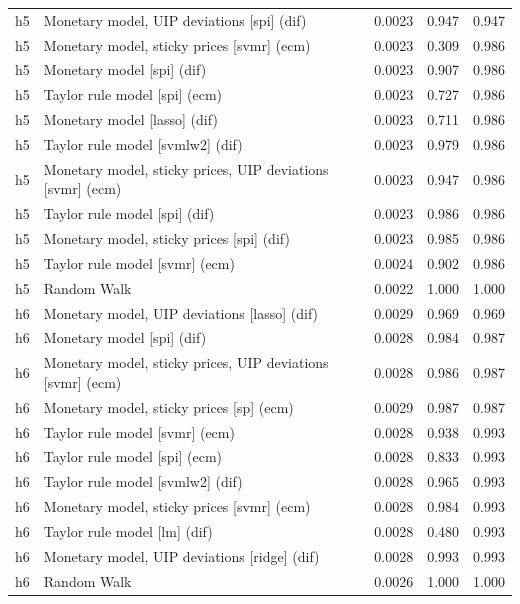 \begin{ThreePartTable}
\begin{longtable}[t]{cp{5.5cm}ccc}
\addlinespace
h5 & \raggedright Monetary model, UIP deviations [spi] (dif) & 0.0023 & 0.947 & 0.947\\
h5 & \raggedright Monetary model, sticky prices [svmr] (ecm) & 0.0023 & 0.309 & 0.986\\
h5 & \raggedright Monetary model [spi] (dif) & 0.0023 & 0.907 & 0.986\\
h5 & \raggedright Taylor rule model [spi] (ecm) & 0.0023 & 0.727 & 0.986\\
h5 & \raggedright Monetary model [lasso] (dif) & 0.0023 & 0.711 & 0.986\\
h5 & \raggedright Taylor rule model [svmlw2] (dif) & 0.0023 & 0.979 & 0.986\\
h5 & \raggedright Monetary model, sticky prices, UIP deviations [svmr] (ecm) & 0.0023 & 0.947 & 0.986\\
h5 & \raggedright Taylor rule model [spi] (dif) & 0.0023 & 0.986 & 0.986\\
h5 & \raggedright Monetary model, sticky prices [spi] (dif) & 0.0023 & 0.985 & 0.986\\
h5 & \raggedright Taylor rule model [svmr] (ecm) & 0.0024 & 0.902 & 0.986\\
h5 & \raggedright Random Walk & 0.0022 & 1.000 & 1.000\\
\addlinespace
h6 & \raggedright Monetary model, UIP deviations [lasso] (dif) & 0.0029 & 0.969 & 0.969\\
h6 & \raggedright Monetary model [spi] (dif) & 0.0028 & 0.984 & 0.987\\
h6 & \raggedright Monetary model, sticky prices, UIP deviations [svmr] (ecm) & 0.0028 & 0.986 & 0.987\\
h6 & \raggedright Monetary model, sticky prices [sp] (ecm) & 0.0029 & 0.987 & 0.987\\
h6 & \raggedright Taylor rule model [svmr] (ecm) & 0.0028 & 0.938 & 0.993\\
h6 & \raggedright Taylor rule model [spi] (ecm) & 0.0028 & 0.833 & 0.993\\
h6 & \raggedright Taylor rule model [svmlw2] (dif) & 0.0028 & 0.965 & 0.993\\
h6 & \raggedright Monetary model, sticky prices [svmr] (ecm) & 0.0028 & 0.984 & 0.993\\
h6 & \raggedright Taylor rule model [lm] (dif) & 0.0028 & 0.480 & 0.993\\
h6 & \raggedright Monetary model, UIP deviations [ridge] (dif) & 0.0028 & 0.993 & 0.993\\
h6 & \raggedright Random Walk & 0.0026 & 1.000 & 1.000\\

\end{longtable}
\end{ThreePartTable}
